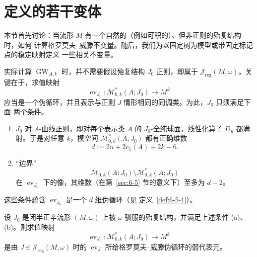 
\section{定义的若干变体}\label{sec:7-2}

本节首先讨论：当流形 $M$ 有一个自然的（例如可积的）、但非正则的殆复结构时，如何
计算格罗莫夫--威滕不变量。随后，我们为以固定树为模型或带固定标记点的稳定映射定义
一些相关不变量。

实际计算 $\operatorname{GW}_{A,k}$ 时，并不需要假设殆复结构 $J_0$ 正则，即属于
$\mathcal J_{\mathrm{reg}}(M,\omega)$。关键在于，求值映射
\[
  \operatorname{ev}_{J_0}:\mathcal M^*_{0,k}(A;J_0)\longrightarrow M^k
\]
应当是一个伪循环，并且表示与正则 $J$ 情形相同的同调类。为此，$J_0$ 只须满足下面
两个条件。

\begin{enumerate}[label=(\alph*),leftmargin=3em]
\item $J_0$ 对 $A$-曲线正则，即对每个表示类 $A$ 的 $J_0$-全纯球面，线性化算子
$D_u$ 都满射。于是对任意 $k$，模空间 $\mathcal M^*_{0,k}(A;J_0)$ 都有正确维数
\[
  d:=2n+2c_1(A)+2k-6.
\]
\item “边界”
\[
  \overline{\mathcal M}_{0,k}(A;J_0)
  \setminus\mathcal M^*_{0,k}(A;J_0)
\]
在 $\operatorname{ev}_{J_0}$ 下的像，其维数（在第~\ref{sec:6-5} 节的意义下）至多为
$d-2$。
\end{enumerate}
这些条件蕴含 $\operatorname{ev}_{J_0}$ 是一个 $d$ 维伪循环（见
定义~\ref{def:6-5-1}）。

\begin{lemma}\label{lem:7-2-1}
设 $J_0$ 是闭半正辛流形 $(M,\omega)$ 上被 $\omega$ 驯服的殆复结构，并满足上述条件
(a)、(b)。则求值映射
\[
  \operatorname{ev}_{J_0}:\mathcal M^*_{0,k}(A;J_0)\longrightarrow M^k
\]
是由 $J\in\mathcal J_{\mathrm{reg}}(M,\omega)$ 时的
$\operatorname{ev}_J$ 所给格罗莫夫--威滕伪循环的弱代表元。
\end{lemma}

